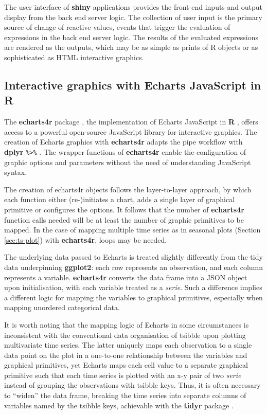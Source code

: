 \documentclass{aucklandthesis}
\begin{document}
The user interface of \textbf{shiny} applications provides the front-end inputs and output display from the back end server logic. The collection of user input is the primary source of change of reactive values, events that trigger the evaluation of expressions in the back end server logic. The results of the evaluated expressions are rendered as the outputs, which may be as simple as prints of R objects or as sophisticated as HTML interactive graphics.

\hypertarget{interactive-graphics-with-echarts-javascript-in-r}{%
\subsection{Interactive graphics with Echarts JavaScript in R}\label{interactive-graphics-with-echarts-javascript-in-r}}

The \textbf{echarts4r} package \autocite{echarts4r}, the implementation of Echarts JavaScript in \textbf{R} \autocite{echarts}, offers access to a powerful open-source JavaScript library for interactive graphics. The creation of Echarts graphics with \textbf{echarts4r} adapts the pipe workflow with \textbf{dplyr} \texttt{\%\textgreater{}\%} \autocite{dplyr,magrittr}. The wrapper functions of \textbf{echarts4r} enable the configuration of graphic options and parameters without the need of understanding JavaScript syntax.

The creation of echarts4r objects follows the layer-to-layer approach, by which each function either (re-)initiates a chart, adds a single layer of graphical primitive or configures the options. It follows that the number of \textbf{echarts4r} function calls needed will be at least the number of graphic primitives to be mapped. In the case of mapping multiple time series as in seasonal plots (Section \ref{sec:ts-plot}) with \textbf{echarts4r}, loops may be needed.

The underlying data passed to Echarts is treated slightly differently from the tidy data \autocite{tidy} underpinning \textbf{ggplot2}: each row represents an observation, and each column represents a variable. \textbf{echarts4r} converts the data frame into a JSON object upon initialisation, with each variable treated as a \emph{serie}. Such a difference implies a different logic for mapping the variables to graphical primitives, especially when mapping unordered categorical data.

It is worth noting that the mapping logic of Echarts in some circumstances is inconsistent with the conventional data organisation of tsibble upon plotting multivariate time series. The latter uniquely maps each observation to a single data point on the plot in a one-to-one relationship between the variables and graphical primitives, yet Echarts maps each cell value to a separate graphical primitive such that each time series is plotted with an x-y pair of two \emph{serie} instead of grouping the observations with tsibble keys. Thus, it is often necessary to ``widen'' the data frame, breaking the time series into separate columns of variables named by the tsibble keys, achievable with the \textbf{tidyr} package \autocite{tidyr}.
\end{document}
